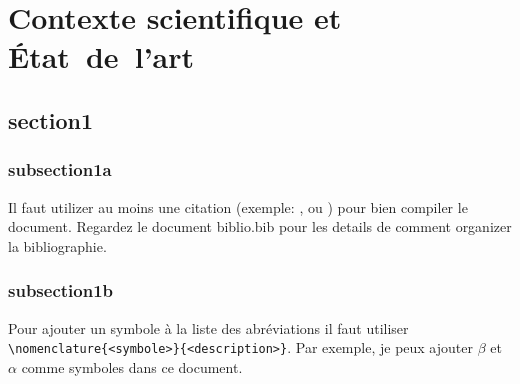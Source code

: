 \chapter{Contexte scientifique et État~de~l'art}
\minitoc

\section{section1}
\subsection{subsection1a}

Il faut utilizer au moins une citation (exemple: \cite{goossens93}, ou \cite{overleaf_project}) pour bien
compiler le document. Regardez le document biblio.bib pour les details de
comment organizer la bibliographie.

\subsection{subsection1b}

Pour ajouter un symbole à la liste des abréviations il faut utiliser
\verb|\nomenclature{<symbole>}{<description>}|. Par exemple, je peux ajouter
$\beta$ et
$\alpha$ comme
symboles dans ce document.
